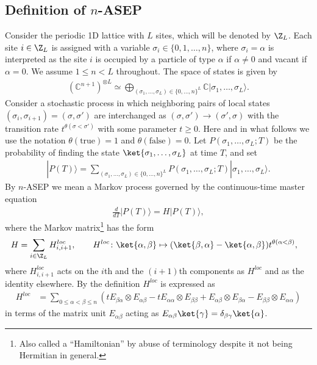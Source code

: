 \subsection{Definition of \texorpdfstring{$n$}{n}-ASEP}
Consider the periodic 1D lattice with $L$ sites, which will be denoted by $\Z_L$.
Each site $i \in \Z_L$ is assigned with a variable
$\sigma_i \in \{0,1,\ldots, n\}$, where 
$\sigma_i = \alpha$ is interpreted as the site $i$ is occupied by a particle of type $\alpha$
if $\alpha \neq 0$ and vacant if $\alpha=0$.
We assume $1 \le n <  L$ throughout.
The space of states is given by
\begin{align}\label{W}
(\mathbb{C}^{n+1})^{\otimes L} \simeq 
\bigoplus_{(\sigma_1,\ldots, \sigma_L) \in\{0,\ldots, n\}^L} 
\mathbb{C}|\sigma_1,\ldots, \sigma_L\rangle.
\end{align}
Consider a stochastic process
in which neighboring pairs of local states
$(\sigma_i, \sigma_{i+1}) = (\sigma, \sigma')$ 
are interchanged as $(\sigma,\sigma') \rightarrow (\sigma', \sigma)$
with the transition rate $t^{\theta(\sigma<\sigma')}$ with some parameter $t\ge 0$.
Here and in what follows we use the notation $\theta(\text{true}) = 1$ and $\theta(\text{false}) = 0$.
%
Let $P(\sigma_1,\ldots, \sigma_L; T)$ be the probability of finding 
the state $\ket{\sigma_1,\ldots, \sigma_L}$ at time $T$, and set
\begin{align}
|P(T)\rangle
= \sum_{(\sigma_1,\ldots, \sigma_L) \in\{0,\ldots, n\}^L}
P(\sigma_1,\ldots, \sigma_L; T)|\sigma_1,\ldots, \sigma_L\rangle.
\end{align}
By $n$-ASEP we mean a Markov process
governed by the continuous-time master equation
\begin{align}
\frac{d}{dT}|P(T)\rangle
= H |P(T)\rangle,
\end{align}
where the Markov matrix\footnote{Also called a ``Hamiltonian'' by abuse of terminology despite it not being Hermitian in general.}
has the form
\begin{align}
H &= \sum_{i \in \Z_L}H^{loc}_{i,i+1},
\qquad 
H^{loc} \colon \ket{\alpha, \beta} \mapsto 
(\ket{\beta,\alpha} - \ket{\alpha, \beta}) t^{\theta(\alpha< \beta)},
\end{align}
where $H^{loc}_{i,i+1}$ acts on the $i$th and the $(i\!+\!1)$th components
as $H^{loc}$ and as the identity elsewhere.
By the definition $H^{loc}$ is expressed as
\begin{align}\label{hloc}
H^{loc} &= \sum_{0\le \alpha < \beta \le n}
(t E_{\beta \alpha}\otimes E_{\alpha \beta} -t E_{\alpha \alpha}\otimes E_{\beta \beta}
+ E_{\alpha \beta} \otimes E_{\beta \alpha} - E_{\beta \beta}\otimes E_{\alpha \alpha})
\end{align}
in terms of the matrix unit $E_{\alpha \beta}$ acting as
$E_{\alpha \beta} \ket{\gamma} = \delta_{\beta \gamma} \ket{\alpha}$.


